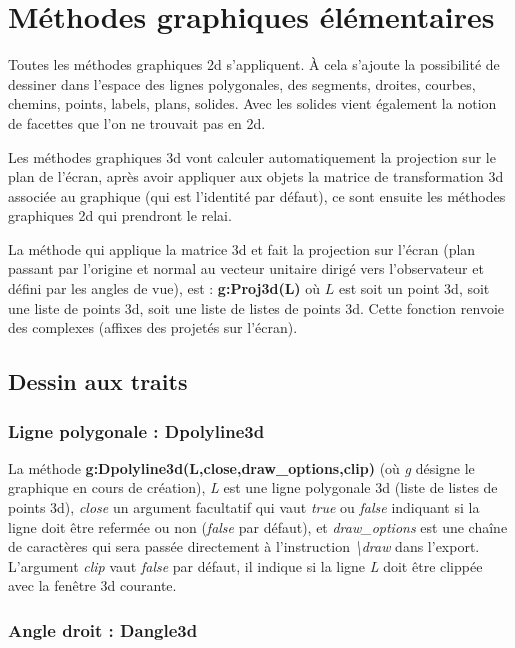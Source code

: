 \section{Méthodes graphiques élémentaires}

Toutes les méthodes graphiques 2d s'appliquent. À cela s'ajoute la possibilité de dessiner dans l'espace des lignes polygonales, des segments, droites, courbes, chemins, points, labels, plans, solides. Avec les solides vient également la notion de facettes que l'on ne trouvait pas en 2d.

Les méthodes graphiques 3d vont calculer automatiquement la projection sur le plan de l'écran, après avoir appliquer aux objets la matrice de transformation 3d associée au graphique (qui est l'identité par défaut), ce sont ensuite les méthodes graphiques 2d qui prendront le relai.

La méthode qui applique la matrice 3d et fait la projection sur l'écran (plan passant par l'origine et normal au vecteur unitaire dirigé vers l'observateur et défini par les angles de vue), est : \textbf{g:Proj3d(L)} où $L$ est soit un point 3d, soit une liste de points 3d, soit une liste de listes de points 3d. Cette fonction renvoie des complexes (affixes des projetés sur l'écran).

\subsection{Dessin aux traits}

\subsubsection{Ligne polygonale : Dpolyline3d}

La méthode \textbf{g:Dpolyline3d(L,close,draw\_options,clip)} (où \emph{g} désigne le graphique en cours de création), \emph{L} est une ligne polygonale 3d (liste de listes de points 3d), \emph{close} un argument facultatif qui vaut \emph{true} ou \emph{false} indiquant si la ligne doit être refermée ou non (\emph{false} par défaut), et \emph{draw\_options} est une chaîne de caractères qui sera passée directement à l'instruction \emph{\textbackslash draw} dans l'export. L'argument \emph{clip} vaut \emph{false} par défaut, il indique si la ligne \emph{L} doit être clippée avec la fenêtre 3d courante.
    
\subsubsection{Angle droit : Dangle3d}

